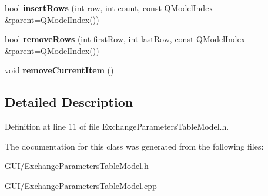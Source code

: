\begin{DoxyCompactItemize}
\mbox{\label{class_exchange_parameters_table_model_abc9cb84a683b483d07bd1819346fd089}} 
bool {\bfseries insert\+Rows} (int row, int count, const Q\+Model\+Index \&parent=Q\+Model\+Index())
\item 
\mbox{\label{class_exchange_parameters_table_model_a040bb1be761392f43971790f414925f9}} 
bool {\bfseries remove\+Rows} (int first\+Row, int last\+Row, const Q\+Model\+Index \&parent=Q\+Model\+Index())
\item 
\mbox{\label{class_exchange_parameters_table_model_a4c87cff76d0b78b894c20f51d3721a6c}} 
void {\bfseries remove\+Current\+Item} ()
\end{DoxyCompactItemize}


\subsection{Detailed Description}


Definition at line 11 of file Exchange\+Parameters\+Table\+Model.\+h.



The documentation for this class was generated from the following files\+:\begin{DoxyCompactItemize}
\item 
G\+U\+I/Exchange\+Parameters\+Table\+Model.\+h\item 
G\+U\+I/Exchange\+Parameters\+Table\+Model.\+cpp\end{DoxyCompactItemize}
